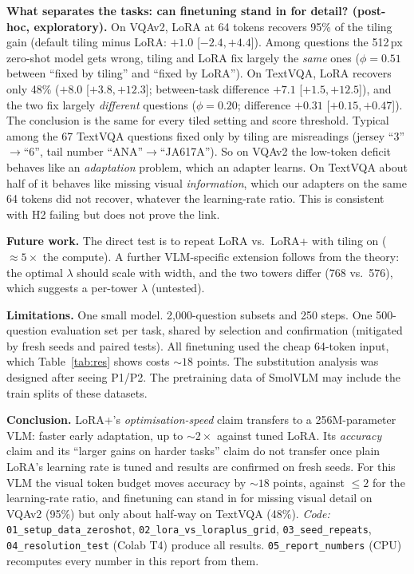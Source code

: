 \documentclass[10pt,a4paper]{article}
\begin{document}
\textbf{What separates the tasks: can finetuning stand in for detail? (post-hoc, exploratory).} On VQAv2, LoRA at 64 tokens recovers
95\% of the tiling gain (default tiling minus LoRA: $+1.0$ [$-2.4,+4.4$]). Among questions the 512\,px zero-shot model
gets wrong, tiling and LoRA fix largely the \emph{same} ones ($\phi=0.51$ between ``fixed by tiling'' and ``fixed by
LoRA''). On TextVQA, LoRA recovers only 48\% ($+8.0$ [$+3.8,+12.3$]; between-task difference $+7.1$ [$+1.5,+12.5$]), and
the two fix largely \emph{different} questions ($\phi=0.20$; difference $+0.31$ [$+0.15,+0.47$]). The conclusion is
the same for every tiled setting and score threshold. Typical among the 67 TextVQA questions fixed only by tiling are misreadings
(jersey ``3''$\to$``6'', tail number ``ANA''$\to$``JA617A''). So on VQAv2 the low-token deficit behaves like an
\emph{adaptation} problem, which an adapter learns. On TextVQA about half of it behaves like missing visual
\emph{information}, which our adapters on the same 64 tokens did not recover, whatever the learning-rate ratio. This is
consistent with H2 failing but does not prove the link.

\textbf{Future work.} The direct test is to repeat LoRA vs.\ LoRA+ with tiling on (${\approx}5\times$ the compute). A further VLM-specific extension follows from the theory: the optimal $\lambda$
should scale with width, and the two towers differ (768 vs.\ 576), which suggests a per-tower $\lambda$ (untested).

\textbf{Limitations.} One small model. 2{,}000-question subsets and 250 steps. One 500-question evaluation set per task,
shared by selection and confirmation (mitigated by fresh seeds and paired tests). All finetuning used the cheap 64-token
input, which Table~\ref{tab:res} shows costs ${\sim}18$ points. The substitution analysis was designed after seeing P1/P2.
The pretraining data of SmolVLM may include the train splits of these datasets.

\textbf{Conclusion.} LoRA+'s \emph{optimisation-speed} claim transfers to a 256M-parameter VLM: faster early adaptation,
up to ${\sim}2\times$ against tuned LoRA. Its \emph{accuracy} claim and its ``larger gains on harder tasks'' claim do not
transfer once plain LoRA's learning rate is tuned and results are confirmed on fresh seeds. For this VLM the visual
token budget moves accuracy by ${\sim}18$ points, against ${\le}2$ for the learning-rate ratio, and finetuning can stand
in for missing visual detail on VQAv2 (95\%) but only about half-way on TextVQA (48\%). \textit{Code:}
\texttt{01\_setup\_data\_zeroshot}, \texttt{02\_lora\_vs\_loraplus\_grid}, \texttt{03\_seed\_repeats},
\texttt{04\_resolution\_test} (Colab T4) produce all results. \texttt{05\_report\_numbers} (CPU) recomputes every number
in this report from them.
\end{document}
